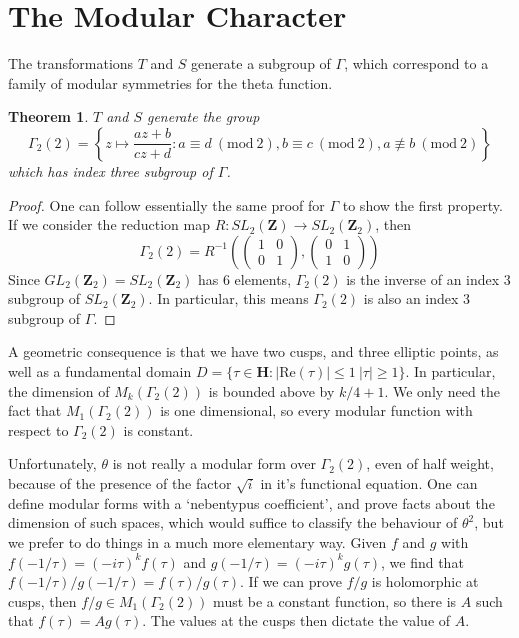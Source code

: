 \documentclass{article}
\theoremstyle{plain}
\newtheorem{theorem}{Theorem}
\theoremstyle{remark}
\theoremstyle{definition}
\begin{document}
\section{The Modular Character}

The transformations $T$ and $S$ generate a subgroup of $\Gamma$, which correspond to a family of modular symmetries for the theta function.

\begin{theorem}
    $T$ and $S$ generate the group
%
\[ \Gamma_2(2) = \left\{ z \mapsto \frac{az + b}{cz + d}: a \equiv d\ (\text{mod}\ 2), b \equiv c\ (\text{mod}\ 2), a \not \equiv b\ (\text{mod}\ 2) \right\} \]
%
which has index three subgroup of $\Gamma$.
\end{theorem}
\begin{proof}
One can follow essentially the same proof for $\Gamma$ to show the first property. If we consider the reduction map $R: SL_2(\mathbf{Z}) \to SL_2(\mathbf{Z}_2)$, then
%
\[ \Gamma_2(2) = R^{-1} \left( \begin{pmatrix} 1 & 0 \\ 0 & 1 \end{pmatrix}, \begin{pmatrix} 0 & 1 \\ 1 & 0 \end{pmatrix} \right) \]
%
Since $GL_2(\mathbf{Z}_2) = SL_2(\mathbf{Z}_2)$ has $6$ elements, $\Gamma_2(2)$ is the inverse of an index 3 subgroup of $SL_2(\mathbf{Z}_2)$. In particular, this means $\Gamma_2(2)$ is also an index 3 subgroup of $\Gamma$.
\end{proof}

A geometric consequence is that we have two cusps, and three elliptic points, as well as a fundamental domain $D = \{ \tau \in \mathbf{H}: |\text{Re}(\tau)| \leq 1\ |\tau| \geq 1 \}$. In particular, the dimension of $M_k(\Gamma_2(2))$ is bounded above by $k/4 + 1$. We only need the fact that $M_1(\Gamma_2(2))$ is one dimensional, so every modular function with respect to $\Gamma_2(2)$ is constant.

Unfortunately, $\theta$ is not really a modular form over $\Gamma_2(2)$, even of half weight, because of the presence of the factor $\sqrt{i}$ in it's functional equation. One can define modular forms with a `nebentypus coefficient', and prove facts about the dimension of such spaces, which would suffice to classify the behaviour of $\theta^2$, but we prefer to do things in a much more elementary way. Given $f$ and $g$ with $f(-1/\tau) = (-i \tau)^k f(\tau)$ and $g(-1/\tau) = (-i \tau)^k g(\tau)$, we find that $f(-1/\tau)/g(-1/\tau) = f(\tau)/g(\tau)$. If we can prove $f/g$ is holomorphic at cusps, then $f/g \in M_1(\Gamma_2(2))$ must be a constant function, so there is $A$ such that $f(\tau) = Ag(\tau)$. The values at the cusps then dictate the value of $A$.
\end{document}
